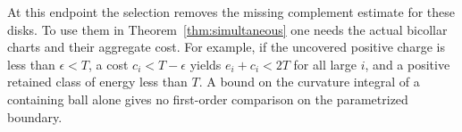 At this endpoint the selection removes the missing complement estimate
for these disks. To use them in Theorem~\ref{thm:simultaneous} one
needs the actual bicollar charts and their aggregate cost. For
example, if the uncovered positive charge is less than \(\epsilon<T\),
a cost \(c_i<T-\epsilon\) yields \(e_i+c_i<2T\) for all large
\(i\), and a positive retained class of energy less than \(T\).
A bound on the curvature integral of a containing ball alone gives
no first-order comparison on the parametrized boundary.
